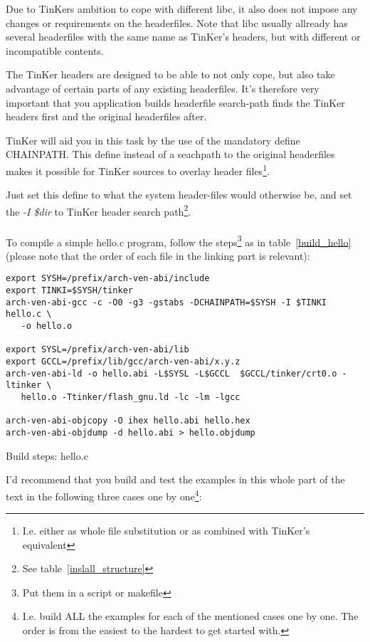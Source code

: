 Due to TinKers ambition to cope with different libc, it also does not impose any changes or requirements on the headerfiles. Note that libc usually allready has several headerfiles with the same name as TinKer's headers, but with different or incompatible contents.

The TinKer headers are designed to be able to not only cope, but also take advantage of certain parts of any existing headerfiles. It's therefore very important that you application builds headerfile search-path finds the TinKer headers first and the original headerfiles after.

TinKer will aid you in this task by the use of the mandatory define CHAINPATH. This define instead of a seachpath to the original headerfiles makes it possible for TinKer sources to overlay header files\footnote{I.e. either as whole file substitution or as combined with TinKer's equivalent}. 

Just set this define to what the system header-files would otherwise be, and set the \textit{-I \$dir} to TinKer header search path\footnote{See table~\ref{inslall_structure}}.
\\\\
To compile a simple hello.c program, follow the steps\footnote{Put them in a script or makefile} as in table~\ref{build_hello} (please note that the order of each file in the linking part is relevant):
\begin{table}[!hbp]
\begin{verbatim}
export SYSH=/prefix/arch-ven-abi/include
export TINKI=$SYSH/tinker
arch-ven-abi-gcc -c -O0 -g3 -gstabs -DCHAINPATH=$SYSH -I $TINKI hello.c \
   -o hello.o

export SYSL=/prefix/arch-ven-abi/lib
export GCCL=/prefix/lib/gcc/arch-ven-abi/x.y.z
arch-ven-abi-ld -o hello.abi -L$SYSL -L$GCCL  $GCCL/tinker/crt0.o -ltinker \
   hello.o -Ttinker/flash_gnu.ld -lc -lm -lgcc

arch-ven-abi-objcopy -O ihex hello.abi hello.hex
arch-ven-abi-objdump -d hello.abi > hello.objdump
\end{verbatim}
\caption{Build steps: hello.c}\label{build_hello}
\end{table}

I'd recommend that you build and test the examples in this whole part of the text in the following three cases one by one\footnote{I.e. build ALL the examples for each of the mentioned cases one by one. The order is from the easiest to the hardest to get started with.}:


